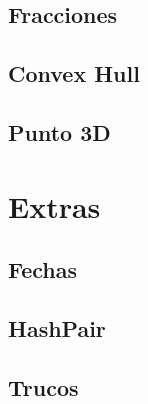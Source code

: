 \subsection{Fracciones}
\raggedbottom
\hrulefill
\subsection{Convex Hull}
\raggedbottom
\hrulefill
\subsection{Punto 3D}
\raggedbottom
\hrulefill
\newpage

\section{Extras}
\subsection{Fechas}
\raggedbottom
\hrulefill
\subsection{HashPair}
\raggedbottom
\hrulefill
\subsection{Trucos}
\raggedbottom
\hrulefill
\newpage

